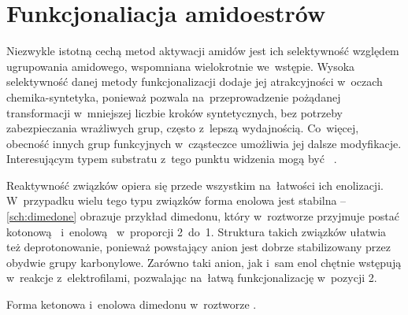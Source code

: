 \section{Funkcjonaliacja amidoestrów}\label{synthesis:amidoesters}


Niezwykle istotną cechą metod aktywacji amidów jest ich selektywność
  względem ugrupowania amidowego, wspomniana wielokrotnie we~wstępie.
Wysoka selektywność danej metody funkcjonalizacji dodaje jej atrakcyjności w~oczach
  chemika-syntetyka, ponieważ pozwala na~przeprowadzenie pożądanej transformacji
  w~mniejszej liczbie kroków syntetycznych, bez potrzeby zabezpieczania wrażliwych grup,
  często z~lepszą wydajnością.
Co~więcej, obecność innych grup funkcyjnych w~cząsteczce umożliwia jej dalsze modyfikacje.
Interesującym typem substratu z~tego punktu widzenia mogą być
  ~.

Reaktywność związków  opiera się przede wszystkim na~łatwości
  ich enolizacji.
W~przypadku wielu tego typu związków forma enolowa jest stabilna \---
  \cref{sch:dimedone} obrazuje przykład dimedonu, który w~roztworze  przyjmuje postać kotonową~
  i~enolową~ w~proporcji 2~do~1.
Struktura takich związków ułatwia też deprotonowanie, ponieważ powstający anion jest
  dobrze stabilizowany przez obydwie grupy karbonylowe.
Zarówno taki anion, jak i~sam enol chętnie wstępują w~reakcje z~elektrofilami,
  pozwalając na~łatwą funkcjonalizację w~pozycji 2.
\begin{marginscheme}
  
  \caption{Forma ketonowa i~enolowa dimedonu w~roztworze .}
  \label{sch:dimedone}
\end{marginscheme}

